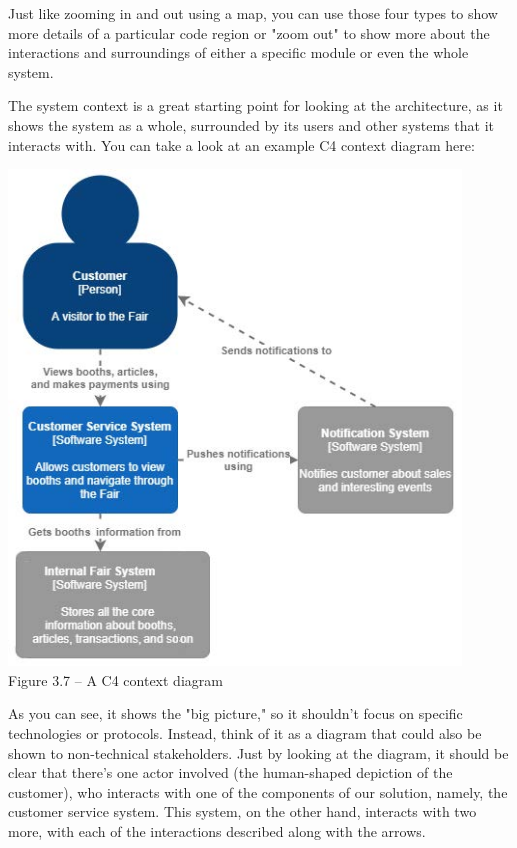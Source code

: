 Just like zooming in and out using a map, you can use those four types to show more details of a particular code region or "zoom out" to show more about the interactions and surroundings of either a specific module or even the whole system.

The system context is a great starting point for looking at the architecture, as it shows the system as a whole, surrounded by its users and other systems that it interacts with. You can take a look at an example C4 context diagram here:


\begin{center}
\includegraphics[width=0.9\textwidth]{content/1/chapter3/images/7.jpg}\\
Figure 3.7 – A C4 context diagram
\end{center}

As you can see, it shows the "big picture," so it shouldn't focus on specific technologies or protocols. Instead, think of it as a diagram that could also be shown to non-technical stakeholders. Just by looking at the diagram, it should be clear that there's one actor involved (the human-shaped depiction of the customer), who interacts with one of the components of our solution, namely, the customer service system. This system, on the other hand, interacts with two more, with each of the interactions described along with the arrows.

